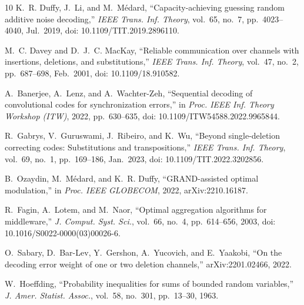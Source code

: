 \documentclass[conference]{IEEEtran}
\begin{document}
\balance
\begin{thebibliography}{10}
K.~R. Duffy, J.~Li, and M.~M\'edard, ``Capacity-achieving guessing random additive noise decoding,''
\emph{IEEE Trans. Inf. Theory}, vol.~65, no.~7, pp.~4023--4040, Jul.~2019,
doi: 10.1109/TIT.2019.2896110.

M.~C. Davey and D.~J.~C. MacKay, ``Reliable communication over channels with insertions, deletions,
and substitutions,'' \emph{IEEE Trans. Inf. Theory}, vol.~47, no.~2, pp.~687--698, Feb.~2001,
doi: 10.1109/18.910582.

A.~Banerjee, A.~Lenz, and A.~Wachter-Zeh, ``Sequential decoding of convolutional codes for
synchronization errors,'' in \emph{Proc. IEEE Inf. Theory Workshop (ITW)}, 2022, pp.~630--635,
doi: 10.1109/ITW54588.2022.9965844.

R.~Gabrys, V.~Guruswami, J.~Ribeiro, and K.~Wu, ``Beyond single-deletion correcting codes:
Substitutions and transpositions,'' \emph{IEEE Trans. Inf. Theory}, vol.~69, no.~1, pp.~169--186,
Jan.~2023, doi: 10.1109/TIT.2022.3202856.

B.~Ozaydin, M.~M\'edard, and K.~R. Duffy, ``GRAND-assisted optimal modulation,'' in
\emph{Proc. IEEE GLOBECOM}, 2022, arXiv:2210.16187.

R.~Fagin, A.~Lotem, and M.~Naor, ``Optimal aggregation algorithms for middleware,''
\emph{J. Comput. Syst. Sci.}, vol.~66, no.~4, pp.~614--656, 2003,
doi: 10.1016/S0022-0000(03)00026-6.

O.~Sabary, D.~Bar-Lev, Y.~Gershon, A.~Yucovich, and E.~Yaakobi, ``On the decoding error weight of
one or two deletion channels,'' arXiv:2201.02466, 2022.

W.~Hoeffding, ``Probability inequalities for sums of bounded random variables,''
\emph{J. Amer. Statist. Assoc.}, vol.~58, no.~301, pp.~13--30, 1963.
\end{thebibliography}
\end{document}
